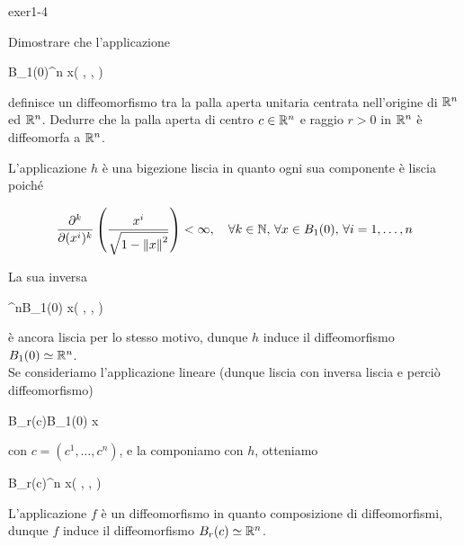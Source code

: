 {exer1-4}
{
Dimostrare che l'applicazione

	{B_{1}(0)}{\R^{n}}
	{x}{\left( , \cdots,  \right)}

definisce un diffeomorfismo tra la palla aperta unitaria centrata nell'origine di $ \mathbb{R}^{n} $ ed $ \mathbb{R}^{n} $. Dedurre che la palla aperta di centro $ c \in \mathbb{R}^{n} $ e raggio $ r > 0 $ in $ \mathbb{R}^{n} $ è diffeomorfa a $ \mathbb{R}^{n} $.
}
{
L'applicazione $ h $ è una bigezione liscia in quanto ogni sua componente è liscia poiché

\begin{equation}
	\pdv[k]{(x^{i})} \left( \dfrac{x^{i}}{\sqrt{ 1-\norm{x}^{2} }} \right) < \infty %
	\qcomma \forall k \in \N, \, \forall x \in B_{1}(0), \, \forall i=1,\dots,n
\end{equation}

La sua inversa

	{\R^{n}}{B_{1}(0)}
	{x}{\left( , \cdots,  \right)}

è ancora liscia per lo stesso motivo, dunque $ h $ induce il diffeomorfismo $ B_{1}(0) \simeq \mathbb{R}^{n} $. \\
Se consideriamo l'applicazione lineare (dunque liscia con inversa liscia e perciò diffeomorfismo)

	{B_{r}(c)}{B_{1}(0)}
	{x}{}

con $ c = (c^{1},\dots,c^{n}) $, e la componiamo con $ h $, otteniamo

	{B_{r}(c)}{\R^{n}}
	{x}{\left( , \cdots,  \right)}

L'applicazione $ f $ è un diffeomorfismo in quanto composizione di diffeomorfismi, dunque $ f $ induce il diffeomorfismo $ B_{r}(c) \simeq \mathbb{R}^{n} $.
}


